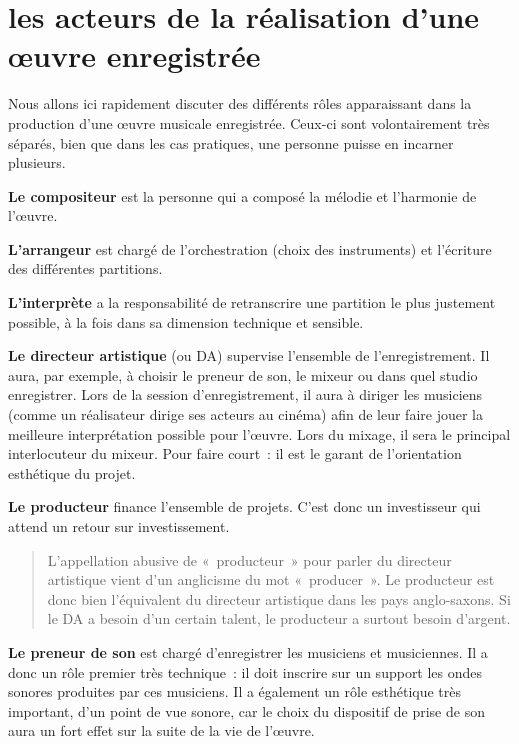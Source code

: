 \documentclass[
]{book}
\begin{document}
\hypertarget{les-acteurs-de-la-ruxe9alisation-dune-ux153uvre-enregistruxe9e}{%
\section{les acteurs de la réalisation d'une œuvre enregistrée}\label{les-acteurs-de-la-ruxe9alisation-dune-ux153uvre-enregistruxe9e}}

Nous allons ici rapidement discuter des différents rôles apparaissant dans la production d'une œuvre musicale enregistrée. Ceux-ci sont volontairement très séparés, bien que dans les cas pratiques, une personne puisse en incarner plusieurs.

\textbf{Le compositeur} est la personne qui a composé la mélodie et l'harmonie de l'œuvre.

\textbf{L'arrangeur} est chargé de l'orchestration (choix des instruments) et l'écriture des différentes partitions.

\textbf{L'interprète} a la responsabilité de retranscrire une partition le plus justement possible, à la fois dans sa dimension technique et sensible.

\textbf{Le directeur artistique} (ou DA) supervise l'ensemble de l'enregistrement. Il aura, par exemple, à choisir le preneur de son, le mixeur ou dans quel studio enregistrer. Lors de la session d'enregistrement, il aura à diriger les musiciens (comme un réalisateur dirige ses acteurs au cinéma) afin de leur faire jouer la meilleure interprétation possible pour l'œuvre. Lors du mixage, il sera le principal interlocuteur du mixeur. Pour faire court~: il est le garant de l'orientation esthétique du projet.

\textbf{Le producteur} finance l'ensemble de projets. C'est donc un investisseur qui attend un retour sur investissement.

\begin{quote}
L'appellation abusive de «~producteur~» pour parler du directeur artistique vient d'un anglicisme du mot «~producer~». Le producteur est donc bien l'équivalent du directeur artistique dans les pays anglo-saxons. Si le DA a besoin d'un certain talent, le producteur a surtout besoin d'argent.
\end{quote}

\textbf{Le preneur de son} est chargé d'enregistrer les musiciens et musiciennes. Il a donc un rôle premier très technique~: il doit inscrire sur un support les ondes sonores produites par ces musiciens. Il a également un rôle esthétique très important, d'un point de vue sonore, car le choix du dispositif de prise de son aura un fort effet sur la suite de la vie de l'œuvre.
\end{document}
